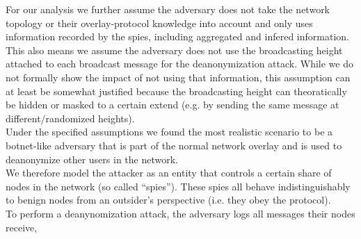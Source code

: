 For our analysis we further assume the adversary does not take the
network topology or their overlay-protocol knowledge into account
and only uses information recorded by the spies, including aggregated
and infered information. \\
This also means we assume the adversary does not use the broadcasting height attached to each broadcast message
for the deanonymization attack. While we do not formally show the impact
of not using that information,
this assumption can at least be somewhat justified because the broadcasting height can
theoratically be hidden or masked to a certain extend (e.g. by sending the same message at different/randomized heights). \\
Under the specified assumptions we found the most realistic scenario
to be a botnet-like adversary that is part of the normal network overlay
and is used to deanonymize other users in the network. \\
We therefore model the attacker as an entity that controls a certain share of nodes in the network (so called ``spies'').
These spies all behave indistinguishably to benign nodes from an outsider's perspective (i.e. they obey the protocol). \\
To perform a deanynomization attack, the adversary logs all messages their nodes receive,
